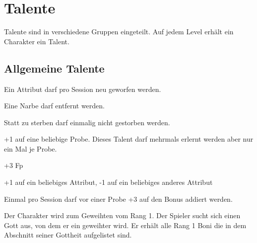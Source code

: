 \documentclass[../../Heldenanleitung2]{subfiles}
\begin{document}
\section{Talente}

Talente sind in verschiedene Gruppen eingeteilt. Auf jedem Level erhält ein Charakter ein Talent.

\subsection{Allgemeine Talente}

\begin{multicols}{2}

\begin{tcolorbox}[title={Glücklicher}, colbacktitle=gray]    
   Ein Attribut darf pro Session neu geworfen werden.
\end{tcolorbox}

\begin{tcolorbox}[title={Glück im Unglück}, colbacktitle=gray]    
   Eine Narbe darf entfernt werden.
\end{tcolorbox}

\begin{tcolorbox}[title={Nahtoderfahrungen}, colbacktitle=gray]    
   Statt zu sterben darf einmalig nicht gestorben werden.
\end{tcolorbox}

\begin{tcolorbox}[title={Fertigkeitenfokus}, colbacktitle=gray]    
   +1 auf eine beliebige Probe. Dieses Talent darf mehrmals erlernt werden aber nur ein Mal je Probe.
\end{tcolorbox}

\begin{tcolorbox}[title={Talentiert}, colbacktitle=gray]    
   +3 Fp
\end{tcolorbox}

\begin{tcolorbox}[title={Umdenken}, colbacktitle=gray]    
   +1 auf ein beliebiges Attribut, -1 auf ein beliebiges anderes Attribut
\end{tcolorbox}

\begin{tcolorbox}[title={Konzentration}, colbacktitle=gray]    
   Einmal pro Session darf vor einer Probe +3 auf den Bonus addiert werden.
\end{tcolorbox}

\begin{tcolorbox}[title={Geweihter (Rang 1)}, colbacktitle=gray]    
   Der Charakter wird zum Geweihten vom Rang 1. Der Spieler sucht sich einen Gott aus, von dem er ein geweihter wird. Er erhält alle Rang 1 Boni die in dem Abschnitt seiner Gottheit aufgelistet sind.
\end{tcolorbox}


\end{multicols}
\end{document}
